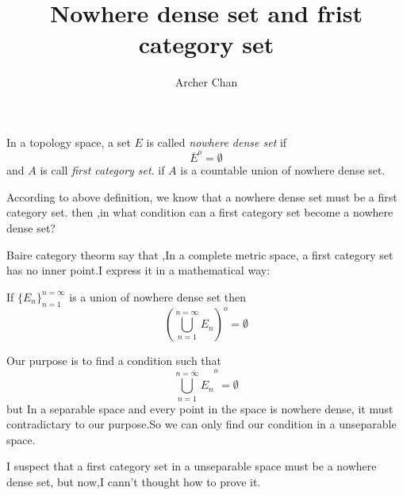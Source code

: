 \documentclass[12pt]{article}
\author{Archer Chan}
\title{Nowhere dense set and frist category set}
\begin{document}
\maketitle
In a topology space, a set $E$ is called \textit{nowhere dense set} if 
\[ \overline{E}^o = \emptyset \]
and $A$ is call \textit{first category set}. if $A$ is a countable union of nowhere dense set.

According to above definition, we know that a nowhere dense set must be a first category set. then ,in what condition can a first category set become a nowhere dense set?

Baire category theorm say that ,In a complete metric space, a first category set has no inner point.I express it in a mathematical way:

If $ \{ E_n \}_{n=1}^{n=\infty} $ is a union of nowhere dense set then 
\[ \left(\bigcup_{n=1}^{n=\infty} E_n \right)^o = \emptyset \]

Our purpose is to find a condition such that 
\[ \overline{\bigcup_{n=1}^{n=\infty} E_n }^o = \emptyset \]
but In a separable space and every point in the space is nowhere dense, it must contradictary to our purpose.So we can only find our condition in a unseparable space.

I suspect that a first category set in a unseparable space must be a nowhere dense set, but now,I cann't thought how to prove it.
\end{document}
